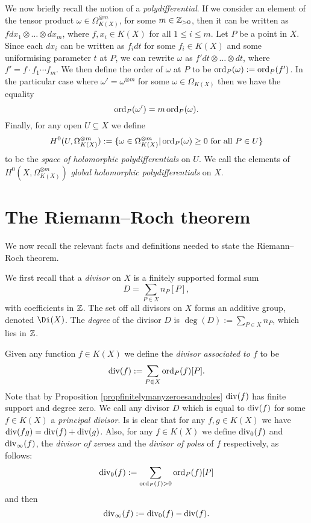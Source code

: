 We now briefly recall the notion of a \emph{polydifferential}.
If we consider an element of the tensor product $\omega \in \Omega_{K(X)}^{\otimes m}$, for some $m \in {\mathbb Z}_{>0}$, then it can be written as $f dx_1\otimes \ldots \otimes dx_m$, where $f, x_i \in K(X)$ for all $1 \leq i \leq m$.
Let $P$ be a point in $X$.
Since each $dx_i$ can be written as $f_i dt$ for some $f_i\in K(X)$ and some uniformising parameter $t$ at $P$, we can rewrite $\omega$ as $f' dt \otimes \ldots \otimes dt$, where $f' = f \cdot f_1 \cdots f_m$.
We then define the order of $\omega$ at $P$ to be $\operatorname{ord}_P(\omega ) := \operatorname{ord}_P(f')$.
In the particular case where $\omega' = \omega^{\otimes m}$ for some $\omega \in \Omega_{K(X)}$ then we have the equality
    \[ 
    \operatorname{ord}_P(\omega') = m\operatorname{ord}_P(\omega).
    \]
Finally, for any open $U \subseteq X$ we define 
    \[
    H^0(U,\Omega_{K(X)}^{\otimes m}):= \{\omega \in \Omega_{K(X)}^{\otimes m} | \ord_P(\omega) \geq 0 \ \text{for all}\ P \in U\}
    \]
to be the \emph{space of holomorphic polydifferentials} on $U$.
We call the elements of $H^0(X,\Omega_{K(X)}^{\otimes m})$ \emph{global holomorphic polydifferentials} on $X$.


\section{The Riemann--Roch theorem}

We now recall the relevant facts and definitions needed to state the Riemann--Roch theorem.

We first recall that a \emph{divisor} on $X$ is a finitely supported formal sum 
    \[
    D = \sum_{P \in X} n_P[P],
    \]
with coefficients in ${\mathbb Z}$.
The set off all divisors on $X$ forms an additive group, denoted $\Di (X)$.
The \emph{degree} of the divisor $D$ is $\deg(D) := \sum_{P \in X} n_P$, which lies in ${\mathbb Z}$.


Given any function $f \in K(X)$ we define the \emph{divisor associated to $f$} to be
    \[
    \operatorname{div}(f) := \sum_{P \in X} \operatorname{ord}_P(f) [P].
    \]
Note that by Proposition \ref{propfinitelymanyzeroesandpoles} $\operatorname{div}(f)$ has finite support and degree zero.
We call any divisor $D$ which is equal to $\operatorname{div}(f)$ for some $f \in K(X)$ a \emph{principal divisor}.
Is is clear that for any $f, g \in K(X)$ we have $\operatorname{div}(fg) = \operatorname{div}(f) + \operatorname{div}(g)$.
Also, for any $f \in K(X)$ we define $\operatorname{div}_0(f)$ and $\operatorname{div}_\infty (f)$, the \emph{divisor of zeroes} and the \emph{divisor of poles} of $f$ respectively, as follows:
    \[
    \operatorname{div}_0(f) := \sum_{\operatorname{ord}_P(f) >0} \operatorname{ord}_P(f)[P]
    \]
and then
    \[
    \operatorname{div}_\infty(f) := \operatorname{div}_0(f) - \operatorname{div}(f).
    \]

